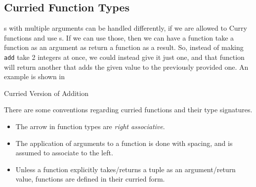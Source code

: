 \subsection{Curried Function Types}\label{subsec:Curried_Function_Types}
s with multiple arguments can be handled differently, if we are allowed to Curry functions and use s.
If we can use those, then we can have a function take a function as an argument as return a function as a result.
So, instead of making \texttt{add} take 2 integers at once, we could instead give it just one, and that function will return another that adds the given value to the previously provided one.
An example is shown in 

\begin{listing}[h!tbp]
\caption{Curried Version of Addition}
\label{lst:Curried_Add_Example}
\end{listing}

There are some conventions regarding curried functions and their type signatures.
\begin{itemize}[noitemsep]
\item The arrow in function types are \emph{right associative}.
\item The application of arguments to a function is done with spacing, and is assumed to associate to the left.
\item Unless a function explicitly takes/returns a tuple as an argument/return value, functions are defined in their curried form.
\end{itemize}


